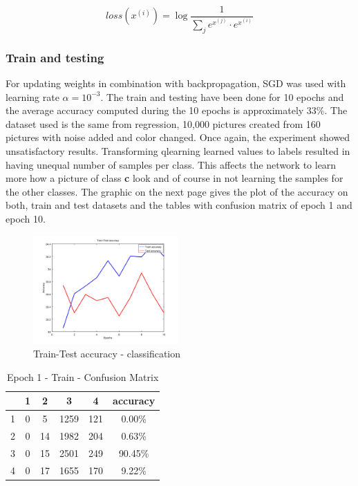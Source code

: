 \begin{equation}
loss(x^{(i)}) = \log {\frac{1}{\displaystyle\sum_{j} e^{x^{(j)}}\cdot e^{x^{(i)}}}}
\end{equation}

\subsubsection{Train and testing}
For updating weights in combination with backpropagation, SGD was used with learning rate $\alpha = 10^{-3}$. The train and testing have been done for 10 epochs and the average accuracy computed during the 10 epochs is approximately $33\%$. The dataset used is the same from regression, 10,000 pictures created from 160 pictures with noise added and color changed. Once again, the experiment showed unsatisfactory results. Transforming qlearning learned values to labels resulted in having unequal number of samples per class. This affects the network to learn more how a picture of class \textbf{c} look and of course in not learning the samples for the other classes.
The graphic on the next page gives the plot of the accuracy on both, train and test datasets and the tables with confusion matrix of epoch 1 and epoch 10.
\newpage
\begin{figure}[h]
	\begin{center}
		\includegraphics[width=209px,height=157px]{src/img/system-design/train-test-classif}
		\caption{Train-Test accuracy - classification} \label{fig:100tt}
    \end{center}
\end{figure}

\begin{table}[H]
\centering
\begin{tabular}{l|c|c|c|c|c}
{}	& 1	& 2		& 3		& 4		& accuracy 	\\ \hline
{1} & 0	& 5		& 1259	& 121	& 0.00\%	\\ \hline                     
{2} & 0	& 14	& 1982	& 204	& 0.63\%	\\ \hline                 
{3} & 0	& 15	& 2501	& 249	& 90.45\%	\\ \hline
{4} & 0	& 17	& 1655	& 170	& 9.22\%	\\ \hline
\end{tabular}
\caption{Epoch 1 - Train - Confusion Matrix}
\label{table:train-ep1}
\end{table}

